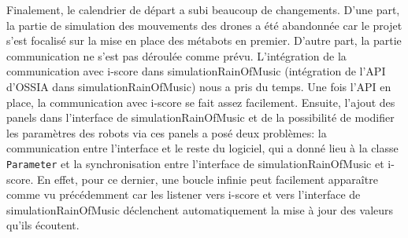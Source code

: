 Finalement, le calendrier de départ a subi beaucoup de changements. D'une part, la partie de simulation des mouvements des drones a été abandonnée car le projet s'est focalisé sur la mise en place des métabots en premier. D'autre part, la partie communication ne s'est pas déroulée comme prévu. L'intégration de la communication avec i-score dans simulationRainOfMusic (intégration de l'API d'OSSIA dans simulationRainOfMusic) nous a pris du temps. Une fois l'API en place, la communication avec i-score se fait assez facilement. Ensuite, l'ajout des panels dans l'interface de simulationRainOfMusic et de la possibilité de modifier les paramètres des robots via ces panels a posé deux problèmes: la communication entre l'interface et le reste du logiciel, qui a donné lieu à la classe \verb|Parameter| et la synchronisation entre l'interface de simulationRainOfMusic et i-score. En effet, pour ce dernier, une boucle infinie peut facilement apparaître comme vu précédemment car les listener vers i-score et vers l'interface de simulationRainOfMusic déclenchent automatiquement la mise à jour des valeurs qu'ils écoutent. 

